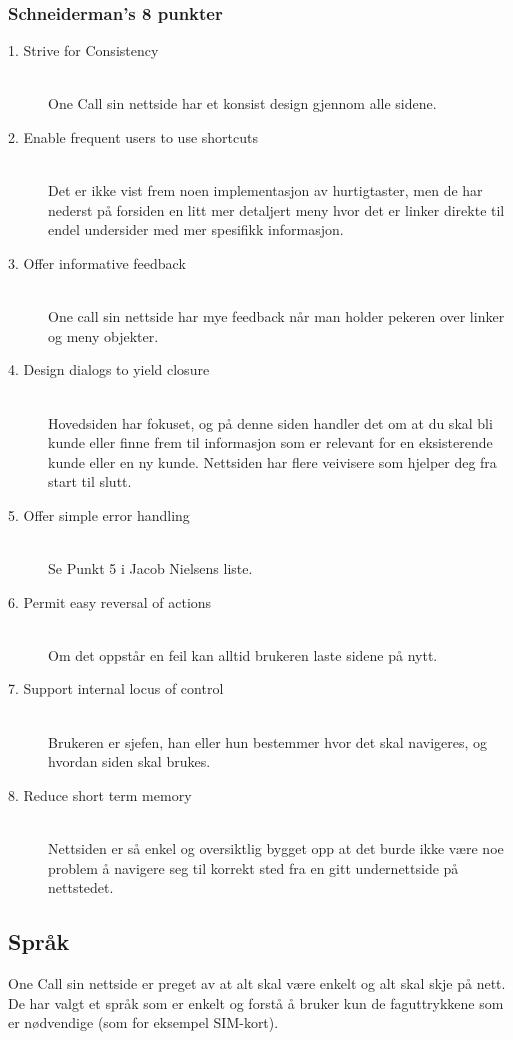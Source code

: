 \documentclass[a4paper, 10pt]{article}
\begin{document}
\subsubsection*{Schneiderman's 8 punkter}

\begin{description}
  \item[1. Strive for Consistency] \hfill \\
    One Call sin nettside har et konsist design gjennom alle sidene.
  \item[2. Enable frequent users to use shortcuts] \hfill \\
    Det er ikke vist frem noen implementasjon av hurtigtaster, men de har nederst på forsiden en litt mer detaljert meny hvor det er linker direkte til endel undersider med mer spesifikk informasjon.
  \item[3. Offer informative feedback] \hfill \\
    One call sin nettside har mye feedback når man holder pekeren over linker og meny objekter.
  \item[4. Design dialogs to yield closure] \hfill \\
    Hovedsiden har fokuset, og på denne siden handler det om at du skal bli kunde eller finne frem til informasjon som er relevant for en eksisterende kunde eller en ny kunde. Nettsiden har flere veivisere som hjelper deg fra start til slutt.
  \item[5. Offer simple error handling] \hfill \\
    Se Punkt 5 i Jacob Nielsens liste.
  \item[6. Permit easy reversal of actions] \hfill \\
    Om det oppstår en feil kan alltid brukeren laste sidene på nytt.  
  \item[7. Support internal locus of control] \hfill \\
    Brukeren er sjefen, han eller hun bestemmer hvor det skal navigeres, og hvordan siden skal brukes.
  \item[8. Reduce short term memory] \hfill \\
    Nettsiden er så enkel og oversiktlig bygget opp at det burde ikke være noe problem å navigere seg til korrekt sted fra en gitt undernettside på nettstedet.
\end{description}


\subsection*{Språk}
One Call sin nettside er preget av at alt skal være enkelt og alt skal skje på nett. De har valgt et språk som er enkelt og forstå å bruker kun de faguttrykkene som er nødvendige (som for eksempel SIM-kort).
\end{document}
